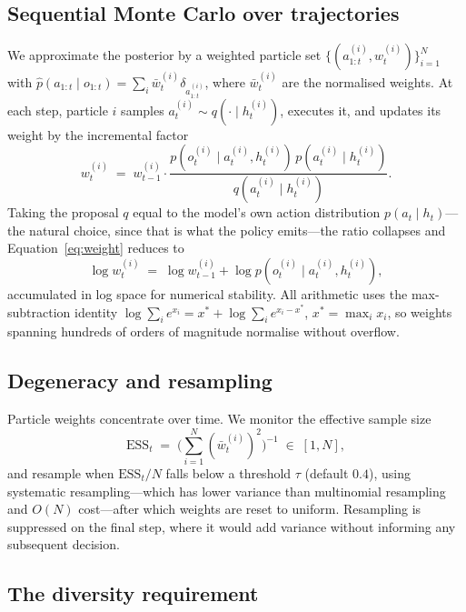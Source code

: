\documentclass[11pt,a4paper]{article}
\begin{document}
\subsection{Sequential Monte Carlo over trajectories}

We approximate the posterior by a weighted particle set
$\{(a_{1:t}^{(i)}, w_t^{(i)})\}_{i=1}^{N}$ with
$\hat p(a_{1:t} \mid o_{1:t}) = \sum_i \bar w_t^{(i)} \delta_{a_{1:t}^{(i)}}$,
where $\bar w_t^{(i)}$ are the normalised weights. At each step, particle $i$
samples $a_t^{(i)} \sim q(\cdot \mid h_t^{(i)})$, executes it, and updates its
weight by the incremental factor
\begin{equation}
w_t^{(i)} \;=\; w_{t-1}^{(i)} \cdot
  \frac{p(o_t^{(i)} \mid a_t^{(i)}, h_t^{(i)})\, p(a_t^{(i)} \mid h_t^{(i)})}
       {q(a_t^{(i)} \mid h_t^{(i)})}.
\label{eq:weight}
\end{equation}
Taking the proposal $q$ equal to the model's own action distribution
$p(a_t \mid h_t)$---the natural choice, since that is what the policy
emits---the ratio collapses and Equation~\eqref{eq:weight} reduces to
\begin{equation}
\log w_t^{(i)} \;=\; \log w_{t-1}^{(i)} + \log p(o_t^{(i)} \mid a_t^{(i)}, h_t^{(i)}),
\label{eq:logweight}
\end{equation}
accumulated in log space for numerical stability. All arithmetic uses the
max-subtraction identity
$\log \sum_i e^{x_i} = x^\ast + \log \sum_i e^{x_i - x^\ast}$,
$x^\ast = \max_i x_i$, so weights spanning hundreds of orders of magnitude
normalise without overflow.

\subsection{Degeneracy and resampling}

Particle weights concentrate over time. We monitor the effective sample size
\begin{equation}
\mathrm{ESS}_t \;=\; \Big( \textstyle\sum_{i=1}^{N} (\bar w_t^{(i)})^2 \Big)^{-1}
\;\in\; [1, N],
\end{equation}
and resample when $\mathrm{ESS}_t / N$ falls below a threshold $\tau$
(default $0.4$), using systematic resampling---which has lower variance than
multinomial resampling and $O(N)$ cost---after which weights are reset to
uniform. Resampling is suppressed on the final step, where it would add
variance without informing any subsequent decision.

\subsection{The diversity requirement}
\end{document}
